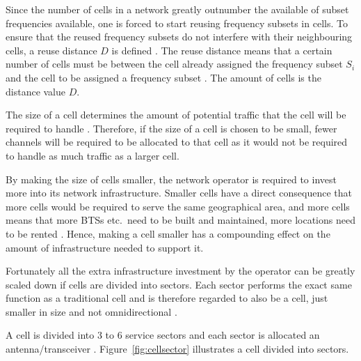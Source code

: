 Since the number of cells in a network greatly outnumber the available of subset frequencies available, one is forced to start reusing frequency subsets in cells\cite{GSMArchitectureProtocolsServices}. To ensure that the reused frequency subsets do not interfere with their neighbouring cells, a reuse distance $D$ is defined \cite{GSMArchitectureProtocolsServices}. The reuse distance means that a certain number of cells must be between the cell already assigned the frequency subset $S_i$ and the cell to be assigned a frequency subset \cite{GSMArchitectureProtocolsServices}. The amount of cells is the distance value $D$.

The size of a cell determines the amount of potential traffic that the cell will be required to handle \cite{GSM92,Eisenblatter,GSMArchitectureProtocolsServices}. Therefore, if the size of a cell is chosen to be small, fewer channels will be required to be allocated to that cell as it would not be required to handle as much traffic as a larger cell\cite{GSMArchitectureProtocolsServices}. 

By making the size of cells smaller, the network operator is required to invest more into its network infrastructure. Smaller cells have a direct consequence that more cells would be required to serve the same geographical area, and more cells means that more \glspl{BTS} etc.\ need to be built and maintained, more locations need to be rented \cite{GSMArchitectureProtocolsServices}. Hence, making a cell smaller has a compounding effect on the amount of infrastructure needed to support it.

Fortunately all the extra infrastructure investment by the operator can be greatly scaled down if cells are divided into sectors\label{def:cellsector}. Each sector performs the exact same function as a traditional cell and is therefore regarded to also be a cell, just smaller in size and not omnidirectional \cite{GSMArchitectureProtocolsServices,GSM92,GSMSysEngin}. 

A cell is divided into 3 to 6 service sectors and each sector is allocated an antenna/transceiver \cite{GSMSysEngin}. Figure~\ref{fig:cellsector} illustrates a cell divided into sectors. 

